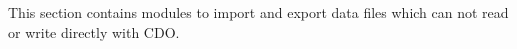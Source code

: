 This section contains modules to import and export data files which
can not read or write directly with CDO.
